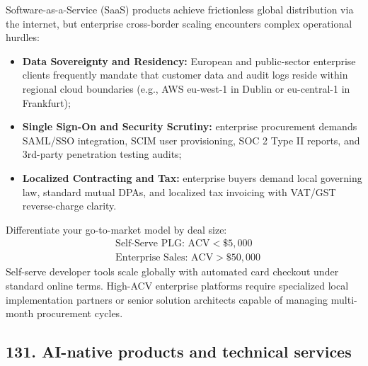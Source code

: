 Software-as-a-Service (SaaS) products achieve frictionless global distribution via the internet, but enterprise cross-border scaling encounters complex operational hurdles:
\begin{itemize}
    \item \textbf{Data Sovereignty and Residency:} European and public-sector enterprise clients frequently mandate that customer data and audit logs reside within regional cloud boundaries (e.g., AWS eu-west-1 in Dublin or eu-central-1 in Frankfurt);
    \item \textbf{Single Sign-On and Security Scrutiny:} enterprise procurement demands SAML/SSO integration, SCIM user provisioning, SOC 2 Type II reports, and 3rd-party penetration testing audits;
    \item \textbf{Localized Contracting and Tax:} enterprise buyers demand local governing law, standard mutual DPAs, and localized tax invoicing with VAT/GST reverse-charge clarity.
\end{itemize}

Differentiate your go-to-market model by deal size:
\begin{equation}
\begin{aligned}
&\text{Self-Serve PLG: } \text{ACV} < \$5,000 \\
&\text{Enterprise Sales: } \text{ACV} > \$50,000
\end{aligned}
\end{equation}
Self-serve developer tools scale globally with automated card checkout under standard online terms. High-ACV enterprise platforms require specialized local implementation partners or senior solution architects capable of managing multi-month procurement cycles.

\subsection{131. AI-native products and technical services}

